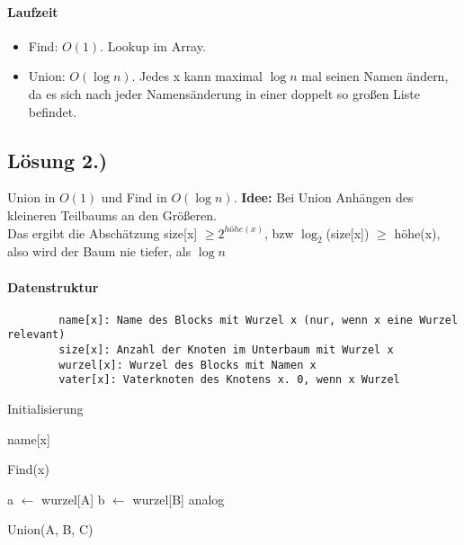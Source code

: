     \paragraph{Laufzeit}
    \begin{itemize}
        \item[] Find: $ O(1) $. Lookup im Array.
        \item[] Union: $ O(\log n) $. Jedes x kann maximal $ \log n $ mal seinen Namen ändern, da es sich nach jeder Namensänderung in einer doppelt so großen Liste befindet.
    \end{itemize}
    
    
    \subsection*{Lösung 2.)}
    Union in $ O(1) $ und Find in $ O(\log n) $. \textbf{Idee:} Bei Union Anhängen des kleineren Teilbaums an den Größeren.\\
    Das ergibt die Abschätzung size[x] $ \geq 2^{höhe(x)} $, bzw $\log_2$(size[x]) $\geq$ höhe(x), also wird der Baum nie tiefer, als $ \log n $
    \paragraph{Datenstruktur}
    \begin{verbatim}
        name[x]: Name des Blocks mit Wurzel x (nur, wenn x eine Wurzel relevant)
        size[x]: Anzahl der Knoten im Unterbaum mit Wurzel x
        wurzel[x]: Wurzel des Blocks mit Namen x
        vater[x]: Vaterknoten des Knotens x. 0, wenn x Wurzel
    \end{verbatim}
    
    \begin{algorithm}[H]
    \SetAlgoLined
    \caption{Initialisierung}
    \end{algorithm}
    
    
    \begin{algorithm}[H]
    \SetAlgoLined
    \Return name[x]\;
    \caption{Find(x)}
    \end{algorithm}
    
    
    \begin{algorithm}[H]
    \SetAlgoLined
    a $ \gets $ wurzel[A]\;
    b $ \gets $ wurzel[B]\;
     {
        analog\;
    }
    \caption{Union(A, B, C)}
    \end{algorithm}
    
